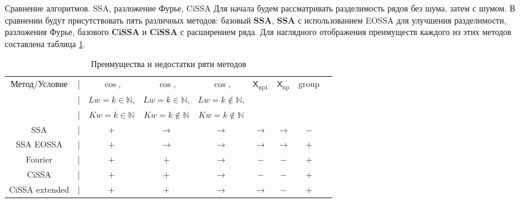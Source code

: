 \documentclass[notheorems, handout]{beamer}
\newcommand{\SSA}{\textbf{SSA}}
\newcommand{\CISSA}{\textbf{CiSSA}}
\newcommand{\TS}{\mathsf{X}}
\begin{document}
	\begin{frame}{Сравнение алгоритмов. SSA, разложение Фурье, CiSSA }
		Для начала будем рассматривать разделимость рядов без шума, затем с шумом.
		В сравнении будут присутствовать пять различных методов: базовый $\SSA$,  $\SSA$ с использованием EOSSA для улучшения разделимости, разложения Фурье, базового $\CISSA$ и $\CISSA$ с расширением ряда. Для наглядного отображения преимуществ каждого из этих методов составлена таблица \ref{tab:advantages}.
		\begin{table}[H]
			\centering
			\tiny
			\begin{center}
				\begin{tabular}{ccccccccc}
					\hline
					Метод/Условие  &|& $\cos$,                 & $\cos$,                    & $\cos$,                     & $\TS_{\mathrm{np1}}$   & $\TS_{\mathrm{np}}$ & group\\ 
					&|& $Lw = k \in \mathbb N$, & $Lw = k \in \mathbb N$,    & $Lw = k \not\in \mathbb N$, &             \\
					&|& $Kw = k \in \mathbb N$  & $Kw = k \not\in \mathbb N$ & $Kw = k \not\in \mathbb N$  &             \\ 
					\hline
					SSA            &|& $+$                     & $\to$                      & $\to$                       & $\to$ & $\to$ & $-$ \\
					SSA EOSSA      &|& $+$                     & $\to$                      & $\to$                       & $\to$ & $\to$ & $+$ \\
					Fourier        &|& $+$                     & $+$                        & $\to$                       & $-$   & $-$ & $+$ \\
					CiSSA          &|& $+$                     & $+$                        & $\to$                       & $-$   & $-$ & $+$ \\
					CiSSA extended &|& $+$                     & $+$                        & $\to$                       & $\to$ & $-$ & $+$ \\
					\hline
				\end{tabular}
			\end{center}
			\caption{Преимущества и недостатки ряти методов} 
			\label{tab:advantages}
		\end{table}
		
\end{frame}
\end{document}

